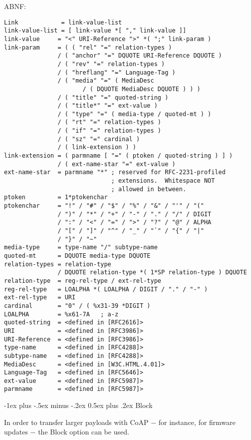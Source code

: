 \documentclass[a4,10pt,landscape]{article}
\makeatletter
\renewcommand{\section}{\@startsection{section}{1}{0mm}%
                                {-1ex plus -.5ex minus -.2ex}%
                                {0.5ex plus .2ex}%
                                {\normalfont\large\bfseries}}
\makeatother
\begin{document}
\begin{multicols}{3}
ABNF:
{\tiny
\begin{verbatim}
Link            = link-value-list
link-value-list = [ link-value *[ "," link-value ]]
link-value     = "<" URI-Reference ">" *( ";" link-param )
link-param     = ( ( "rel" "=" relation-types )
               / ( "anchor" "=" DQUOTE URI-Reference DQUOTE )
               / ( "rev" "=" relation-types )
               / ( "hreflang" "=" Language-Tag )
               / ( "media" "=" ( MediaDesc
                      / ( DQUOTE MediaDesc DQUOTE ) ) )
               / ( "title" "=" quoted-string )
               / ( "title*" "=" ext-value )
               / ( "type" "=" ( media-type / quoted-mt ) )
               / ( "rt" "=" relation-types )
               / ( "if" "=" relation-types )
               / ( "sz" "=" cardinal )
               / ( link-extension ) )
link-extension = ( parmname [ "=" ( ptoken / quoted-string ) ] )
               / ( ext-name-star "=" ext-value )
ext-name-star  = parmname "*" ; reserved for RFC-2231-profiled
                              ; extensions.  Whitespace NOT
                              ; allowed in between.
ptoken         = 1*ptokenchar
ptokenchar     = "!" / "#" / "$" / "%" / "&" / "'" / "("
               / ")" / "*" / "+" / "-" / "." / "/" / DIGIT
               / ":" / "<" / "=" / ">" / "?" / "@" / ALPHA
               / "[" / "]" / "^" / "_" / "`" / "{" / "|"
               / "}" / "~"
media-type     = type-name "/" subtype-name
quoted-mt      = DQUOTE media-type DQUOTE
relation-types = relation-type
               / DQUOTE relation-type *( 1*SP relation-type ) DQUOTE
relation-type  = reg-rel-type / ext-rel-type
reg-rel-type   = LOALPHA *( LOALPHA / DIGIT / "." / "-" )
ext-rel-type   = URI
cardinal       = "0" / ( %x31-39 *DIGIT )
LOALPHA        = %x61-7A   ; a-z
quoted-string  = <defined in [RFC2616]>
URI            = <defined in [RFC3986]>
URI-Reference  = <defined in [RFC3986]>
type-name      = <defined in [RFC4288]>
subtype-name   = <defined in [RFC4288]>
MediaDesc      = <defined in [W3C.HTML.4.01]>
Language-Tag   = <defined in [RFC5646]>
ext-value      = <defined in [RFC5987]>
parmname       = <defined in [RFC5987]>
\end{verbatim}
}

\section{Block}

In order to transfer larger payloads with CoAP $-$ for instance, for
firmware updates $-$ the Block option can be used.


\end{multicols}
\end{document}
